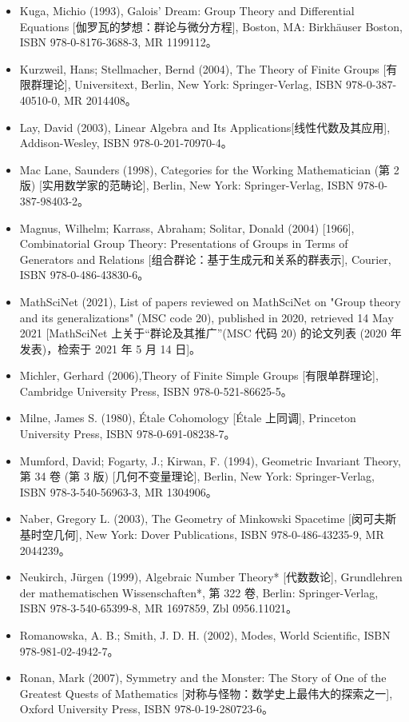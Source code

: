 \begin{itemize}
\item Kuga, Michio (1993), Galois' Dream: Group Theory and Differential Equations [伽罗瓦的梦想：群论与微分方程], Boston, MA: Birkhäuser Boston, ISBN 978-0-8176-3688-3, MR 1199112。  
\item Kurzweil, Hans; Stellmacher, Bernd (2004), The Theory of Finite Groups [有限群理论], Universitext, Berlin, New York: Springer-Verlag, ISBN 978-0-387-40510-0, MR 2014408。
\item Lay, David (2003), Linear Algebra and Its Applications[线性代数及其应用], Addison-Wesley, ISBN 978-0-201-70970-4。  
\item Mac Lane, Saunders (1998), Categories for the Working Mathematician (第 2 版) [实用数学家的范畴论], Berlin, New York: Springer-Verlag, ISBN 978-0-387-98403-2。  
\item Magnus, Wilhelm; Karrass, Abraham; Solitar, Donald (2004) [1966], Combinatorial Group Theory: Presentations of Groups in Terms of Generators and Relations [组合群论：基于生成元和关系的群表示], Courier, ISBN 978-0-486-43830-6。  
\item MathSciNet (2021), List of papers reviewed on MathSciNet on "Group theory and its generalizations" (MSC code 20), published in 2020, retrieved 14 May 2021 [MathSciNet 上关于“群论及其推广”(MSC 代码 20) 的论文列表 (2020 年发表)，检索于 2021 年 5 月 14 日]。  
\item Michler, Gerhard (2006),Theory of Finite Simple Groups [有限单群理论], Cambridge University Press, ISBN 978-0-521-86625-5。  
\item Milne, James S. (1980), Étale Cohomology [Étale 上同调], Princeton University Press, ISBN 978-0-691-08238-7。  
\item Mumford, David; Fogarty, J.; Kirwan, F. (1994), Geometric Invariant Theory, 第 34 卷 (第 3 版) [几何不变量理论], Berlin, New York: Springer-Verlag, ISBN 978-3-540-56963-3, MR 1304906。  
\item Naber, Gregory L. (2003), The Geometry of Minkowski Spacetime [闵可夫斯基时空几何], New York: Dover Publications, ISBN 978-0-486-43235-9, MR 2044239。  
\item Neukirch, Jürgen (1999), Algebraic Number Theory* [代数数论], Grundlehren der mathematischen Wissenschaften*, 第 322 卷, Berlin: Springer-Verlag, ISBN 978-3-540-65399-8, MR 1697859, Zbl 0956.11021。  
\item Romanowska, A. B.; Smith, J. D. H. (2002), Modes, World Scientific, ISBN 978-981-02-4942-7。  
\item Ronan, Mark (2007), Symmetry and the Monster: The Story of One of the Greatest Quests of Mathematics [对称与怪物：数学史上最伟大的探索之一], Oxford University Press, ISBN 978-0-19-280723-6。

\end{itemize}
